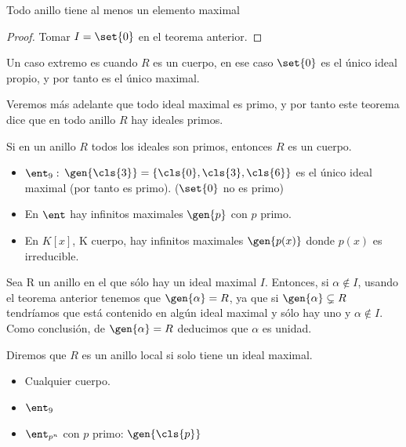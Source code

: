 \begin{prop}
	Todo anillo tiene al menos un elemento maximal
\end{prop}
\begin{proof}
	Tomar $I=\set{0}$ en el teorema anterior.
\end{proof}

\obs Un caso extremo es cuando $R$ es un cuerpo, en ese caso $\set{0}$ es el único ideal propio, y por tanto es el único maximal.

Veremos más adelante que todo ideal maximal es primo, y por tanto este teorema dice que en todo anillo $R$ hay ideales primos.

\begin{prop}
	Si en un anillo $R$ todos los ideales son primos, entonces $R$ es un cuerpo.
\end{prop}

\begin{example}
\begin{itemize}
\item $\ent_9:$ $\gen{\cls{3}} =\{\cls{0},\cls{3},\cls{6} \}$ es el único ideal maximal (por tanto es primo). ($\set{0}$ no es primo)
\item En $\ent$ hay infinitos maximales $\gen{p}$ con $p$ primo.
\item En $K[x]$, K cuerpo, hay infinitos maximales $\gen{p(x)}$ donde $p(x)$ es irreducible.
\end{itemize}
\end{example}

\obs Sea R un anillo en el que sólo hay un ideal maximal $I$. Entonces, si $\alpha \notin I$, usando el teorema anterior tenemos que $\gen{\alpha}=R$, ya que si $\gen{\alpha}\subsetneq R$ tendríamos que está contenido en algún ideal maximal y sólo hay uno y $\alpha \notin I$. Como conclusión, de $\gen{\alpha}=R$ deducimos que $\alpha$ es unidad.

\begin{defn}
	Diremos que $R$ es un anillo local si solo tiene un ideal maximal.
\end{defn}

\begin{example}
	\begin{itemize}
	\item Cualquier cuerpo.
	\item $\ent_9$
	\item $\ent_{p^n}$ con $p$ primo: $\gen{\cls{p}}$
	\end{itemize}
\end{example}


